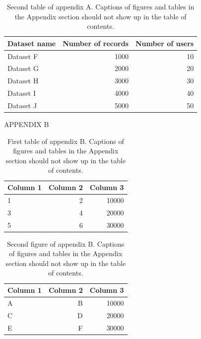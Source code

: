 \begin{table}[ht]
\caption{Second table of appendix A. Captions of figures and tables in the Appendix section should not show up in the table of contents.}
\centering
\fontsize{10}{12}\selectfont
\begin{tabular}{|l|r|r|}
\hline
Dataset name & Number of records  & Number of users \\
\hline 
Dataset F & 1000 & 10 \\
\hline
Dataset G & 2000 & 20 \\
\hline
Dataset H & 3000 & 30 \\
\hline
Dataset I & 4000 & 40\\
\hline
Dataset J & 5000 & 50\\
\hline
\end{tabular}
\label{tab:table2AP}
\end{table}



\clearpage
\pagebreak


\renewcommand{\thetable}{B.\arabic{table}}  
\renewcommand{\thefigure}{B.\arabic{figure}}
\setcounter{figure}{0}
\setcounter{table}{0}


\FloatBarrier
\begin{center}
APPENDIX B
\end{center}


\begin{table}[ht]
\caption{First table of appendix B. Captions of figures and tables in the Appendix section should not show up in the table of contents.}
\centering
\fontsize{10}{12}\selectfont
\begin{tabular}{|l|r|r|}
\hline
Column 1 & Column 2  & Column 3 \\
\hline 
1 & 2 & 10000 \\
\hline
3 & 4 & 20000 \\
\hline
5 & 6 & 30000 \\
\hline
\end{tabular}
\label{tab:table3AP}
\end{table}


\begin{table}[ht]
\caption{Second figure of appendix B. Captions of figures and tables in the Appendix section should not show up in the table of contents.}
\centering
\fontsize{10}{12}\selectfont
\begin{tabular}{|l|r|r|}
\hline
Column 1 & Column 2  & Column 3 \\
\hline 
A & B & 10000 \\
\hline
C & D & 20000 \\
\hline
E & F & 30000 \\
\hline
\end{tabular}
\label{tab:table4AP}
\end{table}


